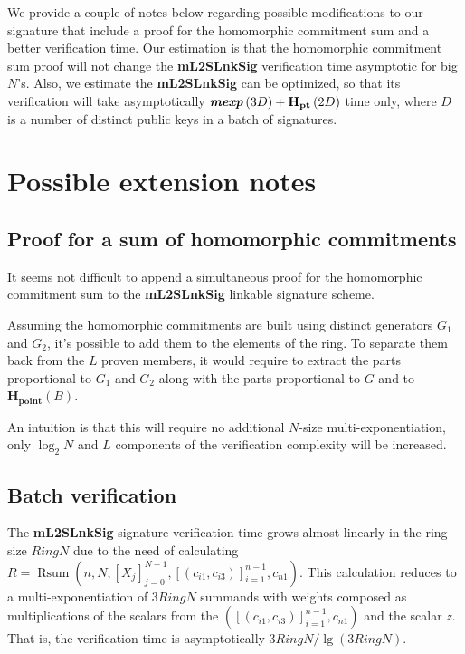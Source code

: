 \documentclass{mathcryptology} %
\DeclareMathOperator{\Rsum}{Rsum}
\newcommand{\RingN}{\textit{RingN}}
\newcommand{\Hpoint}{\textbf{H}_{\textbf{point}}}
\newcommand{\Hpt}{\textbf{H}_{\textbf{pt}}}
\newcommand{\mexp}{\textbf{\textit{mexp}}}
\theoremstyle{title}
\theoremstyle{titleof}
\begin{document}
    We provide a couple of notes below regarding possible modifications to our signature that include a proof for the homomorphic commitment sum and a better verification time. Our estimation is that the homomorphic commitment sum proof will not change the \textbf{mL2SLnkSig} verification time asymptotic for big $N$'s. Also, we estimate the \textbf{mL2SLnkSig} can be optimized, so that its verification will take asymptotically $\mexp\left(3D\right)+\Hpt\left(2D\right)$ time only, where $D$ is a number of distinct public keys in a batch of signatures.


\section{Possible extension notes}


\subsection{Proof for a sum of homomorphic commitments}
    It seems not difficult to append a simultaneous proof for the homomorphic commitment sum to the \textbf{mL2SLnkSig} linkable signature scheme.

    Assuming the homomorphic commitments are built using distinct generators $G_{1}$ and $G_{2}$, it's possible to add them to the elements of the ring. To separate them back from the $L$ proven members, it would require to extract the parts proportional to $G_{1}$ and $G_{2}$ along with the parts proportional to $G$ and to $\Hpoint\left(B\right)$.

    An intuition is that this will require no additional $N$-size multi-exponentiation, only $\log_{2} N$ and $L$ components of the verification complexity will be increased.


\subsection{Batch verification}
    The \textbf{mL2SLnkSig} signature verification time grows almost linearly in the ring size $\RingN$ due to the need of calculating $R=\Rsum\left(n, N, {\left[X_{j}\right]}_{j=0}^{N-1}, {\left[\left(c_{i1}, c_{i3}\right)\right]}_{i=1}^{n-1}, c_{n1}\right)$. This calculation reduces to a multi-exponentiation of $3\RingN$ summands with weights composed as multiplications of the scalars from the $({\left[\left(c_{i1}, c_{i3}\right)\right]}_{i=1}^{n-1}, c_{n1})$ and the scalar $z$. That is, the verification time is asymptotically $3\RingN/\lg\left(3\RingN\right)$.
\end{document}
